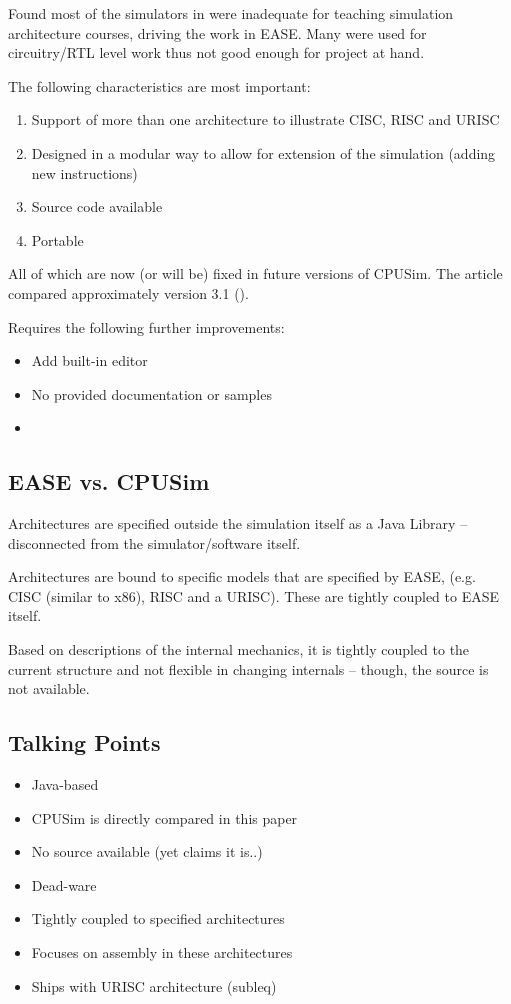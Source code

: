 Found most of the simulators in \cite{Nikolic2009} were inadequate for teaching simulation architecture courses, driving the work in EASE. Many were used for circuitry/RTL level work thus not good enough for project at hand. 

The following characteristics are most important: 

\begin{enumerate}
\item Support of more than one architecture to illustrate CISC, RISC and URISC
\item Designed in a modular way to allow for extension of the simulation (adding new instructions)
\item Source code available
\item Portable
\end{enumerate}

All of which are now (or will be) fixed in future versions of CPUSim. The article compared approximately version 3.1 (\cite{Skrien2001}). 

Requires the following further improvements: 

\begin{itemize}
\item Add built-in editor
\item No provided documentation or samples
\item 
\end{itemize}

\subsection{EASE vs. CPUSim}

Architectures are specified outside the simulation itself as a Java Library -- disconnected from the simulator/software itself. 

Architectures are bound to specific models that are specified by EASE, (e.g. CISC (similar to x86), RISC and a URISC). These are tightly coupled to EASE itself. 

Based on descriptions of the internal mechanics, it is tightly coupled to the current structure and not flexible in changing internals -- though, the source is not available. 


\subsection{Talking Points}

\begin{itemize}
\item Java-based
\item CPUSim is directly compared in this paper
\item No source available (yet claims it is..)
\item Dead-ware
\item Tightly coupled to specified architectures
\item Focuses on assembly in these architectures
\item Ships with URISC architecture (subleq)
\end{itemize}

